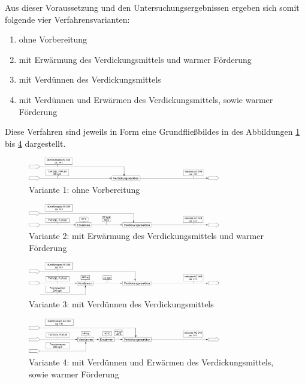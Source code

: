 Aus dieser Voraussetzung und den Untersuchungsergebnissen ergeben sich somit folgende vier Verfahrensvarianten:
\begin{enumerate}
	\item ohne Vorbereitung
	\item mit Erwärmung des Verdickungsmittels und warmer Förderung
	\item mit Verdünnen des Verdickungsmittels
	\item mit Verdünnen und Erwärmen des Verdickungsmittels, sowie warmer Förderung
\end{enumerate}

Diese Verfahren sind jeweils in Form eine Grundfließbildes in des Abbildungen \ref{fig:verfahren_v1} bis \ref{fig:verfahren_v4} dargestellt. 

\begin{figure}[h!]
	\centering
	\includegraphics[width=0.75\textwidth]{img/verfahren_v1}
	\caption{Variante 1: ohne Vorbereitung}
	\label{fig:verfahren_v1}
\end{figure}
\FloatBarrier
\begin{figure}[h!]
	\centering
	\includegraphics[width=0.75\textwidth]{img/verfahren_v2}
	\caption{Variante 2: mit Erwärmung des Verdickungsmittels und warmer Förderung}
	\label{fig:verfahren_v2}
\end{figure}
\FloatBarrier
\begin{figure}[h!]
	\centering
	\includegraphics[width=0.75\textwidth]{img/verfahren_v3}
	\caption{Variante 3: mit Verdünnen des Verdickungsmittels}
	\label{fig:verfahren_v3}
\end{figure}
\FloatBarrier
\begin{figure}[h!]
	\centering
	\includegraphics[width=0.75\textwidth]{img/verfahren_v4}
	\caption{Variante 4: mit Verdünnen und Erwärmen des Verdickungsmittels, sowie warmer Förderung}
	\label{fig:verfahren_v4}
\end{figure}
\FloatBarrier

